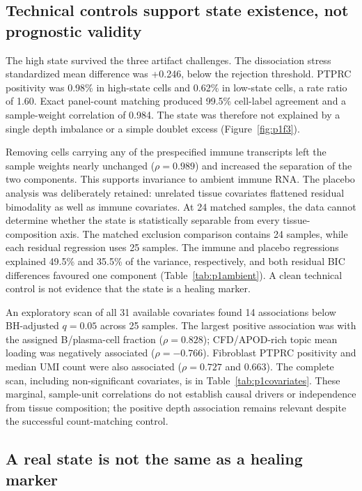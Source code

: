 \subsection{Technical controls support state existence, not prognostic validity}

The high state survived the three artifact challenges. The dissociation stress standardized mean difference was +0.246, below the rejection threshold. PTPRC positivity was 0.98\% in high-state cells and 0.62\% in low-state cells, a rate ratio of 1.60. Exact panel-count matching produced 99.5\% cell-label agreement and a sample-weight correlation of 0.984. The state was therefore not explained by a single depth imbalance or a simple doublet excess (Figure~\ref{fig:p1f3}\label{call:p1f3}).



Removing cells carrying any of the prespecified immune transcripts left the sample weights nearly unchanged ($\rho=0.989$) and increased the separation of the two components. This supports invariance to ambient immune RNA. The placebo analysis was deliberately retained: unrelated tissue covariates flattened residual bimodality as well as immune covariates. At 24 matched samples, the data cannot determine whether the state is statistically separable from every tissue-composition axis. The matched exclusion comparison contains 24 samples, while each residual regression uses 25 samples. The immune and placebo regressions explained 49.5\% and 35.5\% of the variance, respectively, and both residual BIC differences favoured one component (Table~\ref{tab:p1ambient}). A clean technical control is not evidence that the state is a healing marker.

An exploratory scan of all 31 available covariates found 14 associations below BH-adjusted $q=0.05$ across 25 samples. The largest positive association was with the assigned B/plasma-cell fraction ($\rho=0.828$); CFD/APOD-rich topic mean loading was negatively associated ($\rho=-0.766$). Fibroblast PTPRC positivity and median UMI count were also associated ($\rho=0.727$ and 0.663). The complete scan, including non-significant covariates, is in Table~\ref{tab:p1covariates}. These marginal, sample-unit correlations do not establish causal drivers or independence from tissue composition; the positive depth association remains relevant despite the successful count-matching control.

\subsection{A real state is not the same as a healing marker}

